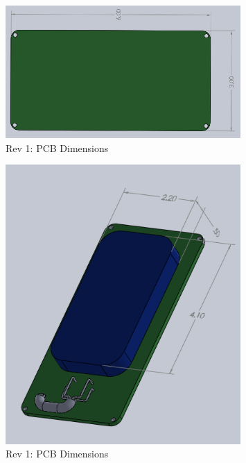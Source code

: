\documentclass{article}
\numberwithin{figure}{section}
\numberwithin{equation}{section}
\begin{document}
{\begin{figure}[H]
	\centering
	\includegraphics[width=0.8\textwidth]{PCB}
	\caption{Rev 1: PCB Dimensions}
	\label{fig:append_pcbdimensions}
\end{figure}

\begin{figure}[H]
	\centering
	\includegraphics[width=0.8\textwidth]{PhoneAndPCB}
	\caption{Rev 1: PCB Dimensions}
	\label{fig:append_pcbphone}
\end{figure}

}
\end{document}
